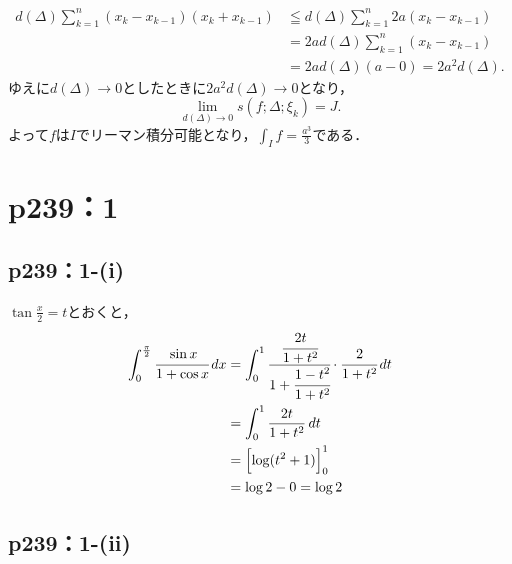\documentclass[a4paper,10pt,fleqn]{ltjsarticle}
\begin{document}
\begin{tleftbar}
\begin{align*}
        d(\Delta) \sum_{k=1}^{n} (x_k - x_{k-1}) (x_k + x_{k-1}) & \leqq d(\Delta) \sum_{k=1}^{n} 2a (x_k - x_{k-1}) \\
                                                                 & = 2a d(\Delta) \sum_{k=1}^{n} (x_k - x_{k-1})     \\
                                                                 & = 2a d(\Delta) (a - 0) = 2a^2 d(\Delta).
    \end{align*}
    ゆえに$d (\Delta) \to 0$としたときに$2a^2 d(\Delta) \to 0$となり，
    \[
        \lim_{d(\Delta) \to 0} s(f;\Delta; \xi_k)=J.
    \]
    よって$f$は$I$でリーマン積分可能となり，$\int_{I} f = \frac{a^3}{3}$である．
\end{tleftbar}


\section*{p239：1}

\subsection*{p239：1-(i)}

\begin{screen}
    $\tan \frac{x}{2}=t$とおくと，
    \begin{align*}
        \int_{0}^{\frac{\pi}{2}} \cfrac{\sin x}{1+\cos x} \, dx & = \int_{0}^{1} \cfrac{\cfrac{2t}{1+t^2}}{1+\cfrac{1-t^2}{1+t^2}} \cdot \cfrac{2}{1+t^2} \, dt \\
                                                                & = \int_{0}^{1} \frac{2t}{1+t^2} \, dt                                                         \\
                                                                & = \Bigl[\log (t^2+1)\Bigl]_{0}^{1}                                                            \\
                                                                & = \log 2-0 = \log 2
    \end{align*}
\end{screen}


\subsection*{p239：1-(ii)}
\end{document}
